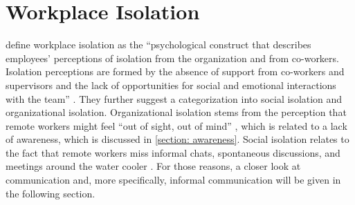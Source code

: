 \section{Workplace Isolation}
\citeauthor{marshall2007workplace} define workplace isolation as the \enquote{psychological construct that describes employees’ perceptions of isolation from the organization and from co-workers. Isolation perceptions are formed by the absence of support from co-workers and supervisors and the lack of opportunities for social and emotional interactions with the team} \autocite[p.~198]{marshall2007workplace}. They further suggest a categorization into social isolation and organizational isolation. Organizational isolation stems from the perception that remote workers might feel \enquote{out of sight, out of mind} \autocite{bailey1999advantages}, which is related to a lack of awareness, which is discussed in \autoref{section: awareness}. Social isolation relates to the fact that remote workers miss informal chats, spontaneous discussions, and meetings around the water cooler \autocite{cooper2002telecommuting}. For those reasons, a closer look at communication and, more specifically, informal communication will be given in the following section.

